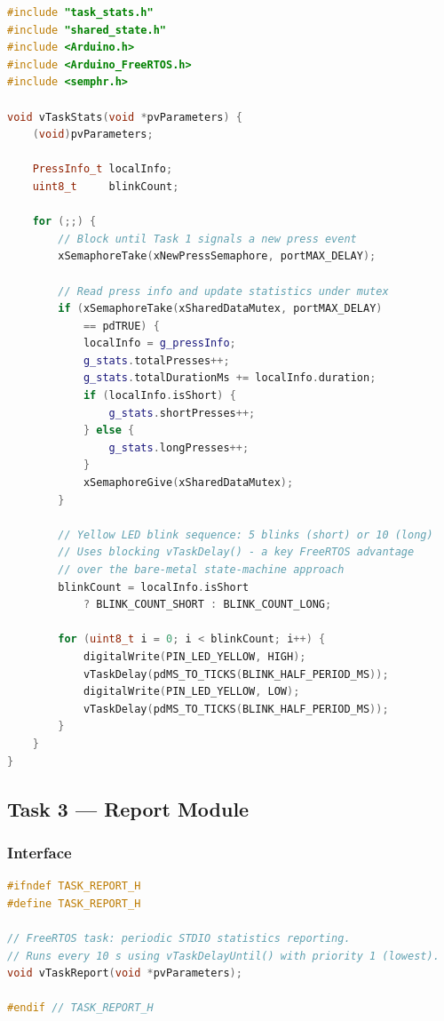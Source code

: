 \begin{lstlisting}[language=C++, caption=lab/lab2\_2/task\_stats.cpp --- Task 2: stats update and blocking blink, label=lst:task_stats_cpp]
#include "task_stats.h"
#include "shared_state.h"
#include <Arduino.h>
#include <Arduino_FreeRTOS.h>
#include <semphr.h>

void vTaskStats(void *pvParameters) {
    (void)pvParameters;

    PressInfo_t localInfo;
    uint8_t     blinkCount;

    for (;;) {
        // Block until Task 1 signals a new press event
        xSemaphoreTake(xNewPressSemaphore, portMAX_DELAY);

        // Read press info and update statistics under mutex
        if (xSemaphoreTake(xSharedDataMutex, portMAX_DELAY)
            == pdTRUE) {
            localInfo = g_pressInfo;
            g_stats.totalPresses++;
            g_stats.totalDurationMs += localInfo.duration;
            if (localInfo.isShort) {
                g_stats.shortPresses++;
            } else {
                g_stats.longPresses++;
            }
            xSemaphoreGive(xSharedDataMutex);
        }

        // Yellow LED blink sequence: 5 blinks (short) or 10 (long)
        // Uses blocking vTaskDelay() - a key FreeRTOS advantage
        // over the bare-metal state-machine approach
        blinkCount = localInfo.isShort
            ? BLINK_COUNT_SHORT : BLINK_COUNT_LONG;

        for (uint8_t i = 0; i < blinkCount; i++) {
            digitalWrite(PIN_LED_YELLOW, HIGH);
            vTaskDelay(pdMS_TO_TICKS(BLINK_HALF_PERIOD_MS));
            digitalWrite(PIN_LED_YELLOW, LOW);
            vTaskDelay(pdMS_TO_TICKS(BLINK_HALF_PERIOD_MS));
        }
    }
}
\end{lstlisting}

\subsection{Task 3 --- Report Module}

\subsubsection{Interface}

\begin{lstlisting}[language=C++, caption=lab/lab2\_2/task\_report.h --- Task 3 declaration, label=lst:task_report_h]
#ifndef TASK_REPORT_H
#define TASK_REPORT_H

// FreeRTOS task: periodic STDIO statistics reporting.
// Runs every 10 s using vTaskDelayUntil() with priority 1 (lowest).
void vTaskReport(void *pvParameters);

#endif // TASK_REPORT_H
\end{lstlisting}

